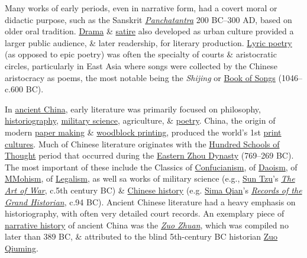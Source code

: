 \documentclass[oneside]{book}
\numberwithin{equation}{section}
\begin{document}
Many works of early periods, even in narrative form, had a covert moral or didactic purpose, such as the Sanskrit \href{https://en.wikipedia.org/wiki/Panchatantra}{\textit{Panchatantra}} 200 BC--300 AD, based on older oral tradition. \href{https://en.wikipedia.org/wiki/Drama}{Drama} \& \href{https://en.wikipedia.org/wiki/Satire}{satire} also developed as urban culture provided a larger public audience, \& later readership, for literary production. \href{https://en.wikipedia.org/wiki/Lyric_poetry}{Lyric poetry} (as opposed to epic poetry) was often the specialty of courts \& aristocratic circles, particularly in East Asia where songs were collected by the Chinese aristocracy as poems, the most notable being the \textit{Shijing} or \href{https://en.wikipedia.org/wiki/Book_of_Songs_(Chinese)}{Book of Songs} (1046--c.600 BC).

In \href{https://en.wikipedia.org/wiki/Chinese_classics}{ancient China}, early literature was primarily focused on philosophy, \href{https://en.wikipedia.org/wiki/Historiography}{historiography}, \href{https://en.wikipedia.org/wiki/Military_science}{military science}, agriculture, \& \href{https://en.wikipedia.org/wiki/Chinese_poetry}{poetry}. China, the origin of modern \href{https://en.wikipedia.org/wiki/Paper_making}{paper making} \& \href{https://en.wikipedia.org/wiki/Woodblock_printing}{woodblock printing}, produced the world's 1st \href{https://en.wikipedia.org/wiki/Print_culture}{print cultures}. Much of Chinese literature originates with the \href{https://en.wikipedia.org/wiki/Hundred_Schools_of_Thought}{Hundred Schools of Thought} period that occurred during the \href{https://en.wikipedia.org/wiki/Zhou_Dynasty}{Eastern Zhou Dynasty} (769--269 BC). The most important of these include the Classics of \href{https://en.wikipedia.org/wiki/Confucianism}{Confucianism}, of \href{https://en.wikipedia.org/wiki/Taoism}{Daoism}, of \href{https://en.wikipedia.org/wiki/Mohism}{MMohism}, of \href{https://en.wikipedia.org/wiki/Legalism_(Chinese_philosophy)}{Legalism}, as well sa works of military science (e.g., \href{https://en.wikipedia.org/wiki/Sun_Tzu}{Sun Tzu}'s \href{https://en.wikipedia.org/wiki/The_Art_of_War}{\textit{The Art of War}}, c.5th century BC) \& \href{https://en.wikipedia.org/wiki/History_of_China}{Chinese history} (e.g. \href{https://en.wikipedia.org/wiki/Sima_Qian}{Sima Qian}'s \href{https://en.wikipedia.org/wiki/Records_of_the_Grand_Historian}{\textit{Records of the Grand Historian}}, c.94 BC). Ancient Chinese literature had a heavy emphasis on historiography, with often very detailed court records. An exemplary piece of \href{https://en.wikipedia.org/wiki/Narrative_history}{narrative history} of ancient China was the \href{https://en.wikipedia.org/wiki/Zuo_Zhuan}{\textit{Zuo Zhuan}}, which was compiled no later than 389 BC, \& attributed to the blind 5th-century BC historian \href{https://en.wikipedia.org/wiki/Zuo_Qiuming}{Zuo Qiuming}.
\end{document}
